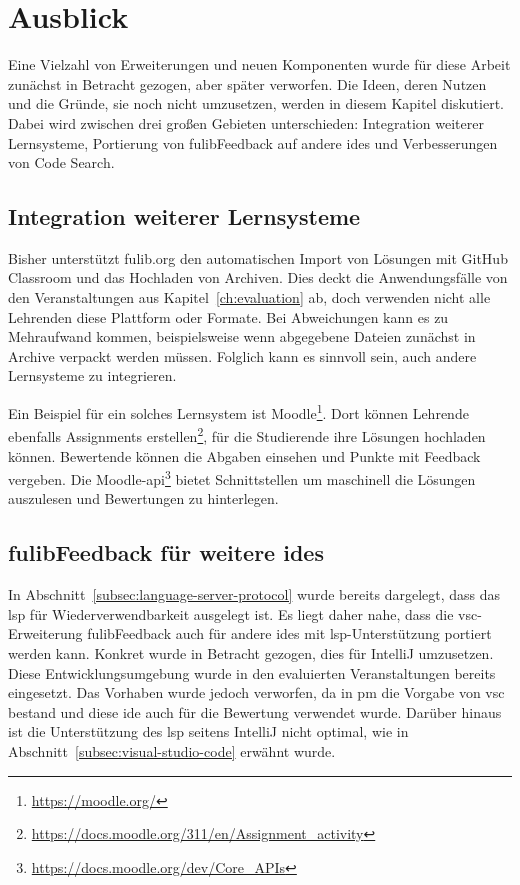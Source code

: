 \chapter{Ausblick}\label{ch:future-work}

Eine Vielzahl von Erweiterungen und neuen Komponenten wurde für diese Arbeit zunächst in Betracht gezogen, aber später verworfen.
Die Ideen, deren Nutzen und die Gründe, sie noch nicht umzusetzen, werden in diesem Kapitel diskutiert.
Dabei wird zwischen drei großen Gebieten unterschieden:
Integration weiterer Lernsysteme, Portierung von fulibFeedback auf andere \acp{ide} und Verbesserungen von Code Search.

\section{Integration weiterer Lernsysteme}

Bisher unterstützt fulib.org den automatischen Import von Lösungen mit GitHub Classroom und das Hochladen von Archiven.
Dies deckt die Anwendungsfälle von den Veranstaltungen aus Kapitel~\ref{ch:evaluation} ab, doch verwenden nicht alle Lehrenden diese Plattform oder Formate.
Bei Abweichungen kann es zu Mehraufwand kommen, beispielsweise wenn abgegebene Dateien zunächst in Archive verpackt werden müssen.
Folglich kann es sinnvoll sein, auch andere Lernsysteme zu integrieren.

Ein Beispiel für ein solches Lernsystem ist Moodle\footnote{\url{https://moodle.org/}}.
Dort können Lehrende ebenfalls Assignments erstellen\footnote{\url{https://docs.moodle.org/311/en/Assignment_activity}}, für die Studierende ihre Lösungen hochladen können.
Bewertende können die Abgaben einsehen und Punkte mit Feedback vergeben.
Die Moodle-\ac{api}\footnote{\url{https://docs.moodle.org/dev/Core_APIs}} bietet Schnittstellen um maschinell die Lösungen auszulesen und Bewertungen zu hinterlegen.

\section{fulibFeedback für weitere \acsp{ide}}\label{sec:other-ides}

In Abschnitt~\ref{subsec:language-server-protocol} wurde bereits dargelegt, dass das \ac{lsp} für Wiederverwendbarkeit ausgelegt ist.
Es liegt daher nahe, dass die \ac{vsc}-Erweiterung fulibFeedback auch für andere \acp{ide} mit \ac{lsp}-Unterstützung portiert werden kann.
Konkret wurde in Betracht gezogen, dies für IntelliJ umzusetzen.
Diese Entwicklungsumgebung wurde in den evaluierten Veranstaltungen bereits eingesetzt.
Das Vorhaben wurde jedoch verworfen, da in \ac{pm} die Vorgabe von \ac{vsc} bestand und diese \ac{ide} auch für die Bewertung verwendet wurde.
Darüber hinaus ist die Unterstützung des \ac{lsp} seitens IntelliJ nicht optimal, wie in Abschnitt~\ref{subsec:visual-studio-code} erwähnt wurde.

